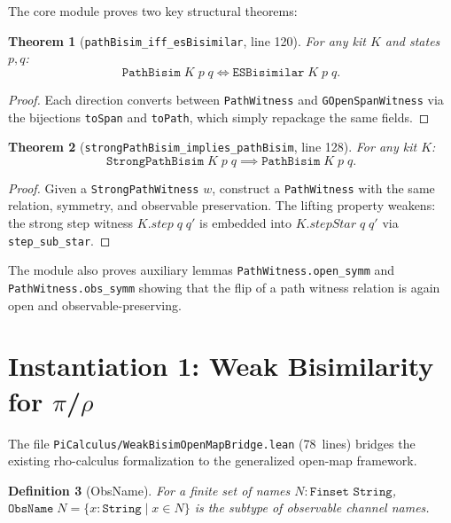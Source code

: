 \documentclass[11pt]{article}
\newtheorem{theorem}{Theorem}[section]
\newtheorem{definition}[theorem]{Definition}
\begin{document}
The core module proves two key structural theorems:

\begin{theorem}[\texttt{pathBisim\_iff\_esBisimilar}, line 120]\label{thm:path-es}
For any kit $K$ and states $p, q$:
\[
  \texttt{PathBisim}\;K\;p\;q \iff \texttt{ESBisimilar}\;K\;p\;q.
\]
\end{theorem}
\begin{proof}
Each direction converts between \texttt{PathWitness} and
\texttt{GOpenSpanWitness} via the bijections \texttt{toSpan} and
\texttt{toPath}, which simply repackage the same fields.
\end{proof}

\begin{theorem}[\texttt{strongPathBisim\_implies\_pathBisim}, line 128]\label{thm:strong-weak}
For any kit $K$:
\[
  \texttt{StrongPathBisim}\;K\;p\;q \implies \texttt{PathBisim}\;K\;p\;q.
\]
\end{theorem}
\begin{proof}
Given a \texttt{StrongPathWitness} $w$, construct a
\texttt{PathWitness} with the same relation, symmetry, and observable
preservation.  The lifting property weakens: the strong step witness
$K.\mathit{step}\;q\;q'$ is embedded into
$K.\mathit{stepStar}\;q\;q'$ via \texttt{step\_sub\_star}.
\end{proof}

The module also proves auxiliary lemmas \texttt{PathWitness.open\_symm}
and \texttt{PathWitness.obs\_symm} showing that the flip of a path
witness relation is again open and observable-preserving.


\section{Instantiation 1: Weak Bisimilarity for $\pi$/$\rho$}\label{sec:pirho}

The file \texttt{PiCalculus/WeakBisimOpenMapBridge.lean} (78~lines)
bridges the existing rho-calculus formalization to the generalized
open-map framework.

\begin{definition}[ObsName]
For a finite set of names $N : \texttt{Finset String}$,
$\texttt{ObsName}\;N = \{x : \texttt{String} \mid x \in N\}$ is the
subtype of observable channel names.
\end{definition}
\end{document}
